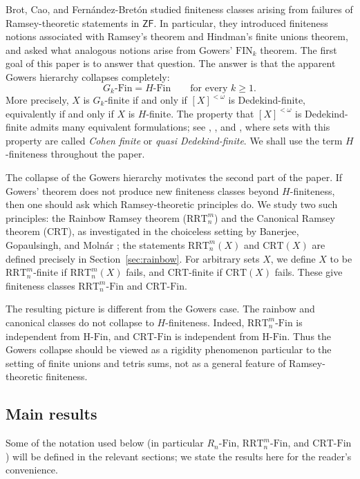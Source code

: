 \documentclass[11pt]{amsart}
\theoremstyle{definition}
\newcommand{\ZF}{\mathsf{ZF}}
\newcommand{\Fin}{\mathrm{Fin}}
\newcommand{\HFin}{\mathrm{H\text{-}Fin}}
\newcommand{\RnFin}[1]{R_{#1}\text{-}\mathrm{Fin}}
\newcommand{\FIN}{\mathrm{FIN}}
\newcommand{\RRT}{\mathrm{RRT}}
\newcommand{\CRT}{\mathrm{CRT}}
\newcommand{\RRTFin}[2]{\RRT^{#1}_{#2}\text{-}\mathrm{Fin}}
\newcommand{\CRTFin}{\CRT\text{-}\mathrm{Fin}}
\begin{document}
Brot, Cao, and Fern\'andez-Bret\'on \cite{BCF} studied finiteness classes arising from failures of Ramsey-theoretic statements in \(\ZF\).  In particular, they introduced finiteness notions associated with Ramsey's theorem and Hindman's finite unions theorem, and asked what analogous notions arise from Gowers' \(\FIN_k\) theorem.  The first goal of this paper is to answer that question.  The answer is that the apparent Gowers hierarchy collapses completely:
\[
    G_k\text{-}\Fin=H\text{-}\Fin
    \qquad\text{for every }k\geq 1.
\]
More precisely, \(X\) is \(G_k\)-finite if and only if \([X]^{<\omega}\) is Dedekind-finite, equivalently if and only if \(X\) is \(H\)-finite.  The property that \([X]^{<\omega}\) is Dedekind-finite admits many equivalent formulations; see \cite{BlackadarFarahKaragila}, \cite{KaragilaSchlicht}, and \cite{KeremedisWajch}, where sets with this property are called \emph{Cohen finite} or \emph{quasi Dedekind-finite}.  We shall use the term \(H\)-finiteness throughout the paper.

The collapse of the Gowers hierarchy motivates the second part of the paper.  If Gowers' theorem does not produce new finiteness classes beyond \(H\)-finiteness, then one should ask which Ramsey-theoretic principles do.  We study two such principles: the Rainbow Ramsey theorem (\(\RRT^m_n\)) and the Canonical Ramsey theorem (\(\CRT\)), as investigated in the choiceless setting by Banerjee, Gopaulsingh, and Moln\'ar \cite{BGM}; the statements \(\RRT^m_n(X)\) and \(\CRT(X)\) are defined precisely in Section~\ref{sec:rainbow}.  For arbitrary sets \(X\), we define \(X\) to be \(\RRT^m_n\)-finite if \(\RRT^m_n(X)\) fails, and \(\CRT\)-finite if \(\CRT(X)\) fails.  These give finiteness classes \(\RRTFin{m}{n}\) and \(\CRTFin\).

The resulting picture is different from the Gowers case.  The rainbow and canonical classes do not collapse to \(H\)-finiteness.  Indeed, \(\RRTFin{m}{n}\) is independent from \(\HFin\), and \(\CRTFin\) is independent from \(\HFin\).  Thus the Gowers collapse should be viewed as a rigidity phenomenon particular to the setting of finite unions and tetris sums, not as a general feature of Ramsey-theoretic finiteness.

\subsection*{Main results}

Some of the notation used below (in particular \(\RnFin{n}\), \(\RRTFin{m}{n}\), and \(\CRTFin\)) will be defined in the relevant sections; we state the results here for the reader's convenience.
\end{document}
